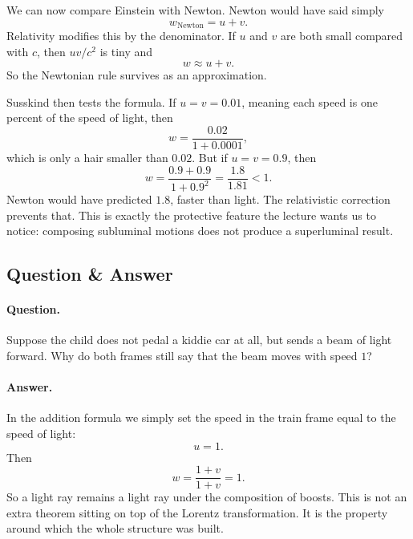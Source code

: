 We can now compare Einstein with Newton. Newton would have said simply
\begin{equation}
w_{\mathrm{Newton}}=u+v.
\end{equation}
Relativity modifies this by the denominator. If \(u\) and \(v\) are both small compared with \(c\), then \(uv/c^2\) is tiny and
\begin{equation}
w\approx u+v.
\end{equation}
So the Newtonian rule survives as an approximation.

Susskind then tests the formula. If \(u=v=0.01\), meaning each speed is one percent of the speed of light, then
\begin{equation}
w=\frac{0.02}{1+0.0001},
\end{equation}
which is only a hair smaller than \(0.02\). But if \(u=v=0.9\), then
\begin{equation}
w=\frac{0.9+0.9}{1+0.9^2}=\frac{1.8}{1.81}<1.
\end{equation}
Newton would have predicted \(1.8\), faster than light. The relativistic correction prevents that. This is exactly the protective feature the lecture wants us to notice: composing subluminal motions does not produce a superluminal result.

\subsection{Question \& Answer}

\paragraph{Question.} Suppose the child does not pedal a kiddie car at all, but sends a beam of light forward. Why do both frames still say that the beam moves with speed \(1\)?

\paragraph{Answer.} In the addition formula we simply set the speed in the train frame equal to the speed of light:
\begin{equation}
u=1.
\end{equation}
Then
\begin{equation}
w=\frac{1+v}{1+v}=1.
\end{equation}
So a light ray remains a light ray under the composition of boosts. This is not an extra theorem sitting on top of the Lorentz transformation. It is the property around which the whole structure was built.

